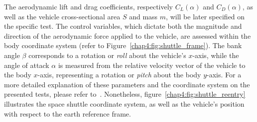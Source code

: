 %
The aerodynamic lift and drag coefficients, respectively $C_L(\alpha)$ and $C_D(\alpha)$, as well as the vehicle cross-sectional area $S$ and mass $m$, will be later specified on the specific test. The control variables, which dictate both the magnitude and direction of the aerodynamic force applied to the vehicle, are assessed within the body coordinate system (refer to Figure~\ref{chap4:fig:shuttle_frame}). The bank angle $\beta$ corresponds to a rotation or \emph{roll} about the vehicle's $x$-axis, while the angle of attack $\alpha$ is measured from the relative velocity vector of the vehicle to the body $x$-axis, representing a rotation or \emph{pitch} about the body $y$-axis. For a more detailed explanation of these parameters and the coordinate system on the presented tests, please refer to~\cite{brenan1983stability}. Nonetheless, figure~\ref{chap4:fig:shuttle_reentry} illustrates the space shuttle coordinate system, as well as the vehicle's position with respect to the earth reference frame.

